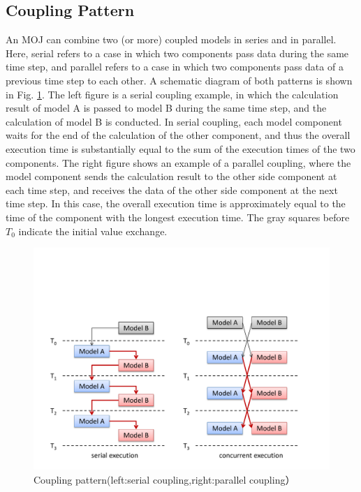 \documentclass[11pt,a4paper]{report}
\newcommand{\figref}[1]{Fig. \ref{#1}}
\begin{document}
\subsection{Coupling Pattern}
An MOJ can combine two (or more) coupled models in series and in parallel.
Here, serial refers to a case in which two components pass data during the same time step, and parallel refers to a case in which two components pass data of a previous time step to each other.
A schematic diagram of both patterns is shown in \figref{fig:coupling_pattern}.
The left figure is a serial coupling example, in which the calculation result of model A is passed to model B during the same time step, and the calculation of model B is conducted.
In serial coupling, each model component waits for the end of the calculation of the other component, and thus the overall execution time is substantially equal to the sum of the execution times of the two components.
The right figure shows an example of a parallel coupling, where the model component sends the calculation result to the other side component at each time step, and receives the data of the other side component at the next time step.
In this case, the overall execution time is approximately equal to the time of the component with the longest execution time.
The gray squares before $ T_0 $ indicate the initial value exchange.

\begin{figure}[H]
\begin{center}
\includegraphics[bb = 0 0 700 400, scale=0.6, clip]{figs/coupling_pattern.pdf}
\caption{Coupling pattern(left:serial coupling,right:parallel coupling）}
\label{fig:coupling_pattern}
\end{center}
\end{figure}
\end{document}

